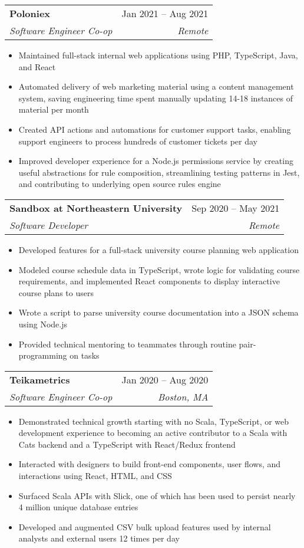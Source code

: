\documentclass[letterpaper, 11pt]{article}
\makeatletter
\newcommand{\resumeItem}[1]{
  \item\small{
    {#1 \vspace{-2pt}}
  }
}
\newcommand{\resumeSubheading}[4]{
  \vspace{-2pt}\item
    \begin{tabular*}{0.97\textwidth}[t]{l@{\extracolsep{\fill}}r}
      \textbf{#1} & #2 \\
     \textit{\small#3} &  \textit{\small#4} \\
    \end{tabular*}\vspace{-7pt}
}
\newcommand{\resumeItemListStart}{\begin{itemize}}
\newcommand{\resumeItemListEnd}{\end{itemize}\vspace{-5pt}}
\makeatother
\begin{document}
        \resumeSubheading
            {Poloniex}{Jan 2021 -- Aug 2021}{Software Engineer Co-op}{Remote}
            \resumeItemListStart
                \resumeItem{Maintained full-stack internal web applications using PHP, TypeScript, Java, and React}
                \resumeItem{Automated delivery of web marketing material using a content management system, saving engineering time spent manually updating 14-18 instances of material per month}
                \resumeItem{Created API actions and automations for customer support tasks, enabling support engineers to process hundreds of customer tickets per day}
                \resumeItem{Improved developer experience for a Node.js permissions service by creating useful abstractions for rule composition, streamlining testing patterns in Jest, and contributing to underlying open source rules engine}
            \resumeItemListEnd
            
        \resumeSubheading
            {Sandbox at Northeastern University}{Sep 2020 -- May 2021}{Software Developer}{Remote}
            \resumeItemListStart
                \resumeItem{Developed features for a full-stack university course planning web application}
                \resumeItem{Modeled course schedule data in TypeScript, wrote logic for validating course requirements, and implemented React components to display interactive course plans to users}
                \resumeItem{Wrote a script to parse university course documentation into a JSON schema using Node.js}
                \resumeItem{Provided technical mentoring to teammates through routine pair-programming on tasks}
            \resumeItemListEnd
            
        \resumeSubheading
            {Teikametrics}{Jan 2020 -- Aug 2020}{Software Engineer Co-op}{Boston, MA}
            \resumeItemListStart
                \resumeItem{Demonstrated technical growth starting with no Scala, TypeScript, or web development experience to becoming an active contributor to a Scala with Cats backend and a TypeScript with React/Redux frontend}
                \resumeItem{Interacted with designers to build front-end components, user flows, and interactions using React, HTML, and CSS}
                \resumeItem{Surfaced Scala APIs with Slick, one of which has been used to persist nearly 4 million unique database entries}
                \resumeItem{Developed and augmented CSV bulk upload features used by internal analysts and external users 12 times per day}
            \resumeItemListEnd        
\end{document}
